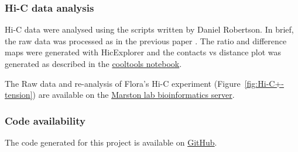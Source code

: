 
\subsubsection{Hi-C data analysis}
Hi-C data were analysed using the scripts written by Daniel Robertson. In brief, the raw data was processed as in the previous paper \citep{Paldi2020ConvergentPericentromeres}. The ratio and difference maps were generated with HicExplorer and the contacts vs distance plot was generated as described in the \href{https://cooltools.readthedocs.io/en/latest/notebooks/contacts_vs_distance.html}{cooltools notebook}.

The Raw data and re-analysis of Flora's Hi-C experiment (Figure~\ref{fig:Hi-C+-tension}) are available on the \href{https://bifx-core3.bio.ed.ac.uk/Results/Adele/Projects/Chuanli2022/Nov_HiC/}{Marston lab bioinformatics server}. 

\subsubsection{Code availability}
The code generated for this project is available on \href{https://github.com/ChuanliHuang/phd}{GitHub}. 